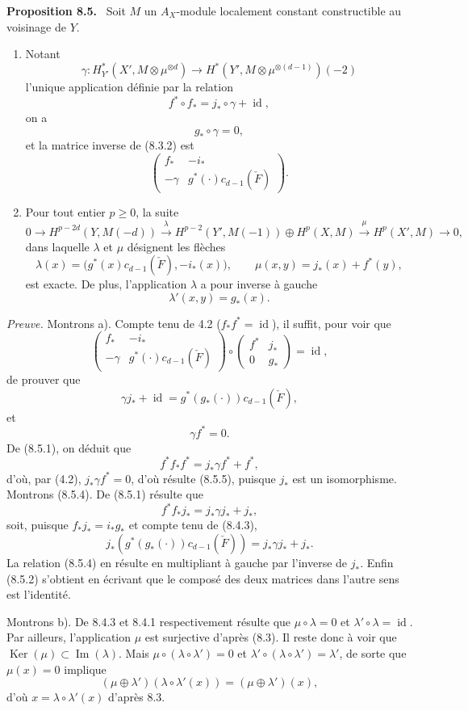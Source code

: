 \documentclass[11pt]{article}
\newenvironment{statement}[1]{\par\medskip\noindent\textbf{#1.}\ }{\par\medskip}
\providecommand{\Ker}{\operatorname{Ker}}
\providecommand{\Ker}{\operatorname{Ker}}
\providecommand{\Ker}{\operatorname{Ker}}
\begin{document}
\begin{statement}{Proposition 8.5}
Soit $M$ un $A_X$-module localement constant constructible au voisinage de $Y$.
\begin{enumerate}[label=\alph*)]
\item Notant
\[
\gamma:H_{Y'}^*(X',M\otimes\mu^{\otimes d})\to
H^*(Y',M\otimes\mu^{\otimes(d-1)})(-2)
\]
l'unique application définie par la relation
\[
f^*\circ f_* = j_*\circ\gamma+\operatorname{id},
\tag{8.5.1}
\]
on a
\[
g_*\circ\gamma=0,
\tag{8.5.2}
\]
et la matrice inverse de (8.3.2) est
\[
\begin{pmatrix}
f_*&-i_*\\
-\gamma&g^*(\cdot)c_{d-1}(\check F)
\end{pmatrix}.
\tag{8.5.3}
\]
\item Pour tout entier $p\ge0$, la suite
\[
0\to H^{p-2d}(Y,M(-d))
\xrightarrow{\lambda}
H^{p-2}(Y',M(-1))\oplus H^p(X,M)
\xrightarrow{\mu}
H^p(X',M)\to0,
\]
dans laquelle $\lambda$ et $\mu$ désignent les flèches
\[
\lambda(x)=\bigl(g^*(x)c_{d-1}(\check F),-i_*(x)\bigr),
\qquad
\mu(x,y)=j_*(x)+f^*(y),
\]
est exacte. De plus, l'application $\lambda$ a pour inverse à gauche
\[
\lambda'(x,y)=g_*(x).
\]
\end{enumerate}
\end{statement}

\emph{Preuve.} Montrons a). Compte tenu de 4.2 ($f_*f^*=\operatorname{id}$), il suffit, pour voir que
\[
\begin{pmatrix}
f_*&-i_*\\
-\gamma&g^*(\cdot)c_{d-1}(\check F)
\end{pmatrix}
\circ
\begin{pmatrix}
f^*&j_*\\
0&g_*
\end{pmatrix}
=\operatorname{id},
\]
de prouver que
\[
\gamma j_*+\operatorname{id}=g^*(g_*(\cdot))c_{d-1}(\check F),
\tag{8.5.4}
\]
et
\[
\gamma f^*=0.
\tag{8.5.5}
\]
De (8.5.1), on déduit que
\[
f^*f_*f^*=j_*\gamma f^*+f^*,
\]
d'où, par (4.2), $j_*\gamma f^*=0$, d'où résulte (8.5.5), puisque $j_*$ est un isomorphisme. Montrons (8.5.4). De (8.5.1) résulte que
\[
f^*f_*j_*=j_*\gamma j_*+j_*,
\]
soit, puisque $f_*j_*=i_*g_*$ et compte tenu de (8.4.3),
\[
j_*(g^*(g_*(\cdot))c_{d-1}(\check F))=j_*\gamma j_*+j_*.
\]
La relation (8.5.4) en résulte en multipliant à gauche par l'inverse de $j_*$. Enfin (8.5.2) s'obtient en écrivant que le composé des deux matrices dans l'autre sens est l'identité.

Montrons b). De 8.4.3 et 8.4.1 respectivement résulte que $\mu\circ\lambda=0$ et $\lambda'\circ\lambda=\operatorname{id}$. Par ailleurs, l'application $\mu$ est surjective d'après (8.3). Il reste donc à voir que $\Ker(\mu)\subset\operatorname{Im}(\lambda)$. Mais $\mu\circ(\lambda\circ\lambda')=0$ et $\lambda'\circ(\lambda\circ\lambda')=\lambda'$, de sorte que $\mu(x)=0$ implique
\[
(\mu\oplus\lambda')(\lambda\circ\lambda'(x))=(\mu\oplus\lambda')(x),
\]
d'où $x=\lambda\circ\lambda'(x)$ d'après 8.3.
\end{document}
